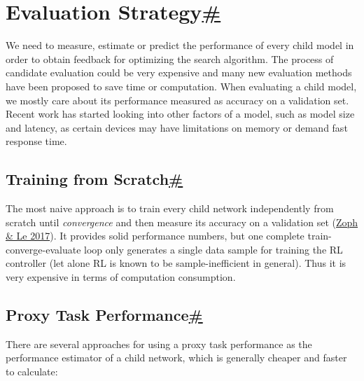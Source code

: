\section{\texorpdfstring{Evaluation Strategy\hyperref[evaluation-strategy]{\#}}{Evaluation Strategy\#}}\label{evaluation-strategy}

We need to measure, estimate or predict the performance of every child model in order to obtain feedback for optimizing the search algorithm. The process of candidate evaluation could be very expensive and many new evaluation methods have been proposed to save time or computation. When evaluating a child model, we mostly care about its performance measured as accuracy on a validation set. Recent work has started looking into other factors of a model, such as model size and latency, as certain devices may have limitations on memory or demand fast response time.

\subsection{\texorpdfstring{Training from Scratch\hyperref[training-from-scratch]{\#}}{Training from Scratch\#}}\label{training-from-scratch}

The most naive approach is to train every child network independently from scratch until \emph{convergence} and then measure its accuracy on a validation set (\href{https://arxiv.org/abs/1611.01578}{Zoph \& Le 2017}). It provides solid performance numbers, but one complete train-converge-evaluate loop only generates a single data sample for training the RL controller (let alone RL is known to be sample-inefficient in general). Thus it is very expensive in terms of computation consumption.

\subsection{\texorpdfstring{Proxy Task Performance\hyperref[proxy-task-performance]{\#}}{Proxy Task Performance\#}}\label{proxy-task-performance}

There are several approaches for using a proxy task performance as the performance estimator of a child network, which is generally cheaper and faster to calculate:

